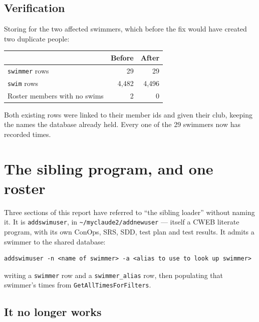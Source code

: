 \documentclass[11pt]{article}
\newcommand{\code}[1]{\texttt{#1}}
\begin{document}
\subsection{Verification}

Storing for the two affected swimmers, which before the fix would have
created two duplicate people:

\begin{center}
\begin{tabular}{lrr}
\toprule
 & \textbf{Before} & \textbf{After} \\
\midrule
\code{swimmer} rows          & 29 & 29 \\
\code{swim} rows             & 4{,}482 & 4{,}496 \\
Roster members with no swims & 2 & 0 \\
\bottomrule
\end{tabular}
\end{center}

\noindent Both existing rows were linked to their member ids and given
their club, keeping the names the database already held.  Every one of
the 29 swimmers now has recorded times.

\section{The sibling program, and one roster}\label{sec:sibling}

Three sections of this report have referred to ``the sibling loader''
without naming it.  It is \code{addswimuser}, in
\code{\textasciitilde/myclaude2/addnewuser} --- itself a CWEB literate
program, with its own ConOps, SRS, SDD, test plan and test results.  It
admits a swimmer to the shared database:

\begin{lstlisting}
addswimuser -n <name of swimmer> -a <alias to use to look up swimmer>
\end{lstlisting}

\noindent writing a \code{swimmer} row and a \code{swimmer\_alias} row,
then populating that swimmer's times from
\code{GetAllTimesForFilters}.

\subsection{It no longer works}
\end{document}
